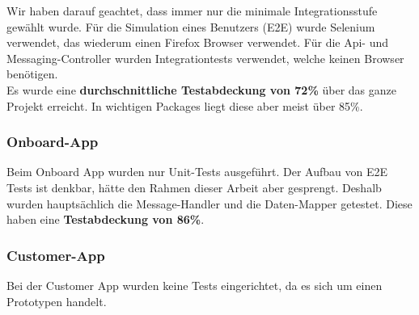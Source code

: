 Wir haben darauf geachtet, dass immer nur die minimale Integrationsstufe gewählt wurde. Für die Simulation eines Benutzers (E2E) wurde Selenium verwendet, das wiederum einen Firefox Browser verwendet. Für die Api- und Messaging-Controller wurden Integrationtests verwendet, welche keinen Browser benötigen.\\

Es wurde eine \textbf{durchschnittliche Testabdeckung von 72\%} über das ganze Projekt erreicht. In wichtigen Packages liegt diese aber meist über 85\%.

\subsubsection{Onboard-App}

Beim Onboard App wurden nur Unit-Tests ausgeführt. Der Aufbau von E2E Tests ist denkbar, hätte den Rahmen dieser Arbeit aber gesprengt. Deshalb wurden hauptsächlich die Message-Handler und die Daten-Mapper getestet. Diese haben eine \textbf{Testabdeckung von 86\%}.

\subsubsection{Customer-App}

Bei der Customer App wurden keine Tests eingerichtet, da es sich um einen Prototypen handelt.


